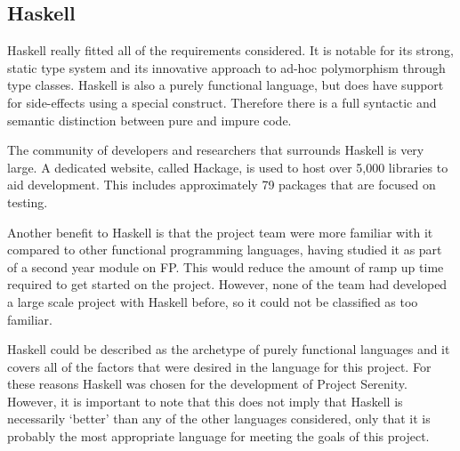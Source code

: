 \subsection{Haskell}


Haskell really fitted all of the requirements considered. It is notable for its strong, static type system and its innovative approach to ad-hoc polymorphism through type classes.\cite{wadler1989typeclasses} Haskell is also a purely functional language, but does have support for side-effects using a special construct. Therefore there is a full syntactic and semantic distinction between pure and impure code.

The community of developers and researchers that surrounds Haskell is very large. A dedicated website, called Hackage, is used to host over 5,000 libraries to aid development. This includes approximately 79 packages that are focused on testing.

Another benefit to Haskell is that the project team were more familiar with it compared to other functional programming languages, having studied it as part of a second year module on FP. This would reduce the amount of ramp up time required to get started on the project. However, none of the team had developed a large scale project with Haskell before, so it could not be classified as too familiar.

Haskell could be described as the archetype of purely functional languages and it covers all of the factors that were desired in the language for this project. For these reasons Haskell was chosen for the development of Project Serenity. However, it is important to note that this does not imply that Haskell is necessarily `better' than any of the other languages considered, only that it is probably the most appropriate language for meeting the goals of this project.
